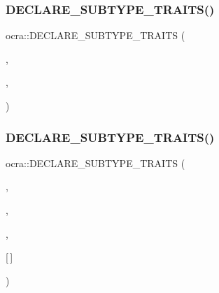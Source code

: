 \hypertarget{namespaceocra_a9122e70f2163c0c2400ac64524e21e34}{}\label{namespaceocra_a9122e70f2163c0c2400ac64524e21e34} 
\subsubsection{\texorpdfstring{D\+E\+C\+L\+A\+R\+E\+\_\+\+S\+U\+B\+T\+Y\+P\+E\+\_\+\+T\+R\+A\+I\+T\+S()}{DECLARE\_SUBTYPE\_TRAITS()}\hspace{0.1cm}{\footnotesize\ttfamily [2/3]}}
{\footnotesize\ttfamily ocra\+::\+D\+E\+C\+L\+A\+R\+E\+\_\+\+S\+U\+B\+T\+Y\+P\+E\+\_\+\+T\+R\+A\+I\+TS (\begin{DoxyParamCaption}\item[{Matrix\+Xd}]{,  }\item[{\hyperlink{namespaceocra_a608bf0522317ed1df3bbfc6a5753bc01}{Matrix\+Xd\+Row}}]{,  }\item[{row}]{ }\end{DoxyParamCaption})}

\hypertarget{namespaceocra_ae9616c1ac4732b558ee47b1191d9a4dd}{}\label{namespaceocra_ae9616c1ac4732b558ee47b1191d9a4dd} 
\subsubsection{\texorpdfstring{D\+E\+C\+L\+A\+R\+E\+\_\+\+S\+U\+B\+T\+Y\+P\+E\+\_\+\+T\+R\+A\+I\+T\+S()}{DECLARE\_SUBTYPE\_TRAITS()}\hspace{0.1cm}{\footnotesize\ttfamily [3/3]}}
{\footnotesize\ttfamily ocra\+::\+D\+E\+C\+L\+A\+R\+E\+\_\+\+S\+U\+B\+T\+Y\+P\+E\+\_\+\+T\+R\+A\+I\+TS (\begin{DoxyParamCaption}\item[{std\+::vector$<$ Matrix\+Xd $\ast$$>$}]{,  }\item[{const Matrix\+Xd \&}]{,  }\item[{$\ast$}]{,  }\item[{operator}]{\mbox{[}$\,$\mbox{]} }\end{DoxyParamCaption})}

